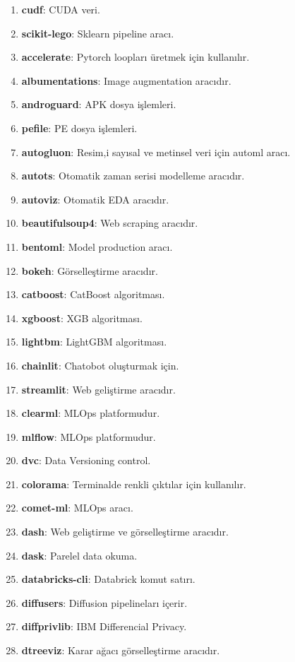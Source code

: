 \begin{enumerate}
    \item \textbf{cudf}: CUDA veri.
    \item \textbf{scikit-lego}: Sklearn pipeline aracı.
    \item \textbf{accelerate}: Pytorch loopları üretmek için kullanılır.
    \item \textbf{albumentations}: Image augmentation aracıdır.
    \item \textbf{androguard}: APK dosya işlemleri.
    \item \textbf{pefile}: PE dosya işlemleri.
    \item \textbf{autogluon}: Resim,i sayısal ve metinsel veri için automl aracı.
    \item \textbf{autots}: Otomatik zaman serisi modelleme aracıdır.
    \item \textbf{autoviz}: Otomatik EDA aracıdır.
    \item \textbf{beautifulsoup4}: Web scraping aracıdır.
    \item \textbf{bentoml}: Model production aracı.
    \item \textbf{bokeh}: Görselleştirme aracıdır.
    \item \textbf{catboost}: CatBoost algoritması.
    \item \textbf{xgboost}: XGB algoritması.
    \item \textbf{lightbm}: LightGBM algoritması.
    \item \textbf{chainlit}: Chatobot oluşturmak için.
    \item \textbf{streamlit}: Web geliştirme aracıdır.
    \item \textbf{clearml}: MLOps platformudur.
    \item \textbf{mlflow}: MLOps platformudur.
    \item \textbf{dvc}: Data Versioning control.
    \item \textbf{colorama}: Terminalde renkli çıktılar için kullanılır.
    \item \textbf{comet-ml}: MLOps aracı.
    \item \textbf{dash}: Web geliştirme ve görselleştirme aracıdır.
    \item \textbf{dask}: Parelel data okuma.
    \item \textbf{databricks-cli}: Databrick komut satırı.
    \item \textbf{diffusers}: Diffusion pipelineları içerir.
    \item \textbf{diffprivlib}: IBM Differencial Privacy.
    \item \textbf{dtreeviz}: Karar ağacı görselleştirme aracıdır.

\end{enumerate}

